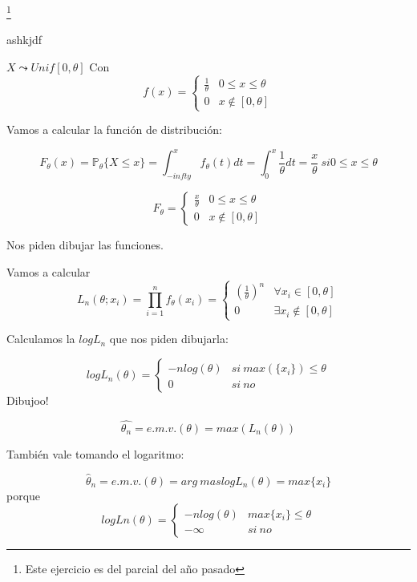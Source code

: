 \begin{problem}[11]
\footnote{Este ejercicio es del parcial del año pasado}

ashkjdf
\solution

$X\leadsto Unif[0,\theta]$
Con \[ f(x) = \displaystyle\left\{\begin{array}{cc}
\frac{1}{\theta} & 0\leq x \leq \theta\\
0 & x \notin [0,\theta]
\end{array}\right.\]

Vamos a calcular la función de distribución:

\[F_{\theta} (x) = \mathbb{P}_{\theta}\{X\leq x\} = \int_{-infty}^x f_{\theta}(t)dt = \int_0^x \frac{1}{\theta} dt = \frac{x}{\theta} \ si 0\leq x \leq \theta\]

\[F_{\theta} = \left\{\begin{array}{cc}
\frac{x}{\theta} & 0\leq x \leq \theta\\
0 & x \notin [0,\theta]
\end{array}\right.\]

Nos piden dibujar las funciones. 



Vamos a calcular \[L_n(\theta;x_i) = \prod_{i=1}^n f_{\theta} (x_i) = \left\{\begin{array}{cc}
\left(\frac{1}{\theta}\right)^n & \forall x_i \in [0,\theta]\\
0 & \exists x_i\notin [0,\theta]
\end{array}\right.\]

Calculamos la $logL_n$ que nos piden dibujarla:

\[logL_n(\theta) = \left\{\begin{array}{cc}
-nlog(\theta) & si \ max(\{x_i\})\leq \theta\\
0 & si \ no
\end{array}\right.\]
Dibujoo!

\[\hat{\theta_n} = e.m.v.(\theta) = max\left(L_n(\theta)\right)\]

También vale tomando el logaritmo:

\[\hat{\theta}_n = e.m.v. (\theta) = arg\ mas logL_n(\theta) = max\{x_i\}\]
porque \[ logLn(\theta) = \displaystyle\left\{\begin{array}{cc}
-nlog(\theta) & max\{x_i\} \leq \theta\\
-\infty & si \ no
\end{array}\right.\]
\end{problem}


